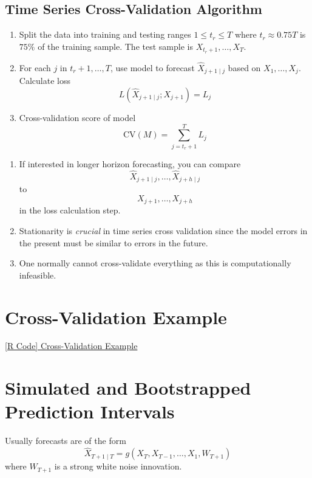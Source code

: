 \subsection*{Time Series Cross-Validation Algorithm}
\begin{enumerate}[(1)]
      \item Split the data into training and testing ranges $ 1\le t_r\le T $
            where $ t_r\approx 0.75T $ is $ 75\% $ of the training sample.
            The test sample is $ X_{t_r+1},\ldots,X_T $.
      \item For each $ j $ in $ t_r+1,\ldots,T $, use model to forecast
            $ \hat{X}_{j+1\mid j} $ based on $ X_1,\ldots,X_j $. Calculate loss
            \[ L(\hat{X}_{j+1\mid j};X_{j+1})=L_j \]
      \item Cross-validation score of model
            \[ \text{CV}(M)=\sum_{j=t_r+1}^{T} L_j \]
\end{enumerate}
\begin{Remark}{}{}
      \begin{enumerate}
            \item If interested in longer horizon forecasting, you can compare
                  \[ \hat{X}_{j+1\mid j},\ldots,\hat{X}_{j+h\mid j} \]
                  to
                  \[ X_{j+1},\ldots,X_{j+h} \]
                  in the loss calculation step.
            \item Stationarity is \emph{crucial} in time series cross validation
                  since the model errors in the present must be similar to errors in the future.
            \item One normally cannot cross-validate everything as this is computationally
                  infeasible.
      \end{enumerate}
\end{Remark}
\section{Cross-Validation Example}
\href{https://github.com/Hextical/university-notes/blob/master/year-3/semester-2/STAT%20443/code/6.4%20-%20Cross-Validation%20Example.R}{[R Code] Cross-Validation Example}
\section{Simulated and Bootstrapped Prediction Intervals}
Usually forecasts are of the form
\[ \hat{X}_{T+1\mid T}=g(X_T,X_{T-1},\ldots,X_1,W_{T+1}) \]
where $ W_{T+1} $ is a strong white noise innovation.

